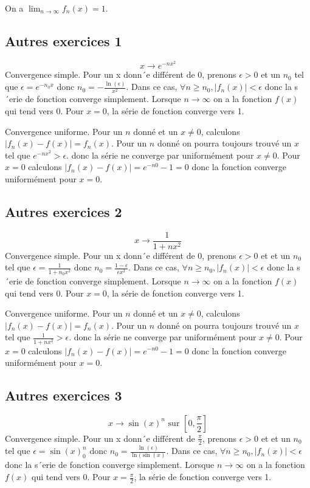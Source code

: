 \documentclass[]{book}
\theoremstyle{definition}
\begin{document}
On a $\lim_{n \to \infty} f_n(x) = 1$.


\subsection*{Autres exercices 1}
$$x \to e^{-nx^2}$$
Convergence simple. Pour un x donn´e diff\'erent de 0, prenons $\epsilon> $0 et un $n_0$ tel que $\epsilon = e^{-n_0x}$ donc $n_0 = -\frac{\ln(\epsilon)}{x^2}$. Dans ce cas, $\forall n \geq n_0, |f_n(x)| < \epsilon$ donc la s´erie de fonction converge simplement. Lorsque $n \to \infty$ on a la fonction $f(x)$ qui tend vers 0. Pour $x=0$, la s\'erie de fonction converge vers 1.

Convergence uniforme. Pour un $n$ donn\'e et un $x \neq 0$, calculons $|f_n(x) - f(x)| = f_n(x)$. Pour un $n$ donn\'e on pourra toujours trouv\'e un $x$ tel que $e^{-nx^2} > \epsilon$. donc la s\'erie ne converge par uniform\'ement pour $x \neq 0$. Pour $x=0$ calculons $|f_n(x) - f(x)| = e^{-n0} -1 = 0$ donc la fonction converge uniform\'ement pour $x=0$.

\subsection*{Autres exercices 2}
$$x \to \frac{1}{1+nx^2}$$
Convergence simple. Pour un x donn´e diff\'erent de 0, prenons $\epsilon> $0 et et un $n_0$ tel que $\epsilon = \frac{1}{1+n_0x^2}$ donc $n_0 = \frac{1-\epsilon}{\epsilon x^2}$. Dans ce cas, $\forall n \geq n_0, |f_n(x)| < \epsilon$ donc la s´erie de fonction converge simplement. Lorsque $n \to \infty$ on a la fonction $f(x)$ qui tend vers 0. Pour $x=0$, la s\'erie de fonction converge vers 1.

Convergence uniforme. Pour un $n$ donn\'e et un $x \neq 0$, calculons $|f_n(x) - f(x)| = f_n(x)$. Pour un $n$ donn\'e on pourra toujours trouv\'e un $x$ tel que $\frac{1}{1+nx^2} > \epsilon$. donc la s\'erie ne converge par uniform\'ement pour $x \neq 0$. Pour $x=0$ calculons $|f_n(x) - f(x)| = e^{-n0} -1 = 0$ donc la fonction converge uniform\'ement pour $x=0$.

\subsection*{Autres exercices 3}
$$x \to \sin(x)^n \text{ sur } [0,\frac{\pi}{2}]$$
Convergence simple. Pour un x donn´e diff\'erent de $\frac{\pi}{2}$, prenons $\epsilon> 0$ et et un $n_0$ tel que $\epsilon = \sin(x)^n_0$ donc $n_0 = \frac{\ln(\epsilon)}{\ln(\sin(x)}$. Dans ce cas, $\forall n \geq n_0, |f_n(x)| < \epsilon$ donc la s´erie de fonction converge simplement. Lorsque $n \to \infty$ on a la fonction $f(x)$ qui tend vers 0. Pour $x=\frac{\pi}{2}$, la s\'erie de fonction converge vers 1.
\end{document}
